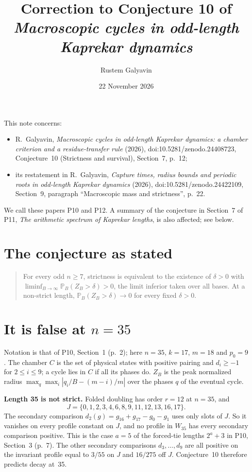 \documentclass[11pt]{amsart}
\title[Correction to Conjecture 10]{Correction to Conjecture 10 of \emph{Macroscopic cycles in odd-length Kaprekar dynamics}}
\author{Rustem Galyavin}
\date{22 November 2026}
\newcommand{\PP}{\mathbb{P}}
\begin{document}
\maketitle

\noindent This note concerns:
\begin{itemize}
\item R.~Galyavin, \emph{Macroscopic cycles in odd-length Kaprekar dynamics: a chamber criterion and a residue-transfer rule} (2026), doi:10.5281/zenodo.24408723, Conjecture~10 (Strictness and survival), Section~7, p.~12;
\item its restatement in R.~Galyavin, \emph{Capture times, radius bounds and periodic roots in odd-length Kaprekar dynamics} (2026), doi:10.5281/zenodo.24422109, Section~9, paragraph ``Macroscopic mass and strictness'', p.~22.
\end{itemize}
We call these papers P10 and P12. A summary of the conjecture in Section~7 of P11, \emph{The arithmetic spectrum of Kaprekar lengths}, is also affected; see below.

\section*{The conjecture as stated}
\begin{quote}
For every odd \(n\ge7\), strictness is equivalent to the existence of \(\delta>0\) with \(\liminf_{B\to\infty}\PP_B(Z_B>\delta)>0\), the limit inferior taken over all bases. At a non-strict length, \(\PP_B(Z_B>\delta)\to0\) for every fixed \(\delta>0\).
\end{quote}

\section*{It is false at \(n=35\)}
Notation is that of P10, Section~1 (p.~2); here \(n=35\), \(k=17\), \(m=18\) and \(p_0=9\). The chamber \(C\) is the set of physical states with positive pairing and \(d_i\ge-1\) for \(2\le i\le9\); a cycle lies in \(C\) if all its phases do. \(Z_B\) is the peak normalized radius \(\max_q\max_i|q_i/B-(m-i)/m|\) over the phases \(q\) of the eventual cycle.

\medskip\noindent\textbf{Length 35 is not strict.} Folded doubling has order \(r=12\) at \(n=35\), and
\[
J=\{0,1,2,3,4,6,8,9,11,12,13,16,17\}.
\]
The secondary comparison \(d_2(g)=g_{16}+g_{17}-g_0-g_1\) uses only slots of \(J\). So it vanishes on every profile constant on \(J\), and no profile in \(W_{35}\) has every secondary comparison positive. This is the case \(a=5\) of the forced-tie lengths \(2^a+3\) in P10, Section~3 (p.~7). The other secondary comparisons \(d_3,\ldots,d_9\) are all positive on the invariant profile equal to \(3/55\) on \(J\) and \(16/275\) off \(J\). Conjecture~10 therefore predicts decay at~35.
\end{document}
